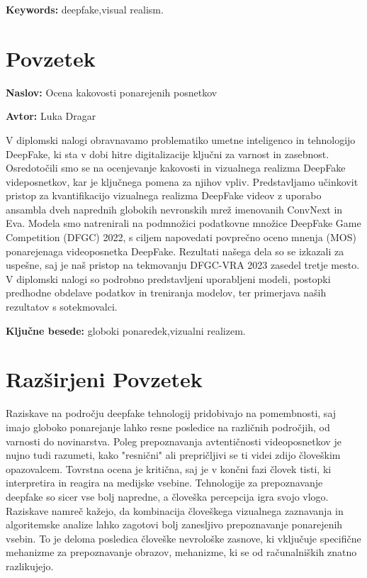 \documentclass[a4paper,12pt,openright]{book}
\newcommand{\ttitle}{Ocena kakovosti ponarejenih posnetkov}
\newcommand{\tauthor}{Luka Dragar}
\newcommand{\tkeywords}{globoki ponaredek,vizualni realizem}
\newcommand{\tkeywordsEn}{deepfake,visual realism}
\newcommand{\clearemptydoublepage}{\newpage{\pagestyle{empty}\cleardoublepage}}
\begin{document}
\bigskip

\noindent\textbf{Keywords:} \tkeywordsEn.
\clearemptydoublepage

{}
\chapter*{Povzetek}

\noindent\textbf{Naslov:} \ttitle
\bigskip

\noindent\textbf{Avtor:} \tauthor
\bigskip

\noindent V diplomski nalogi obravnavamo problematiko umetne inteligenco in tehnologijo DeepFake, ki sta v dobi hitre digitalizacije ključni za varnost in zasebnost. Osredotočili smo se na ocenjevanje kakovosti in vizualnega realizma DeepFake videposnetkov, kar je ključnega pomena za njihov vpliv. Predstavljamo učinkovit pristop za kvantifikacijo vizualnega realizma DeepFake videov z uporabo ansambla dveh naprednih globokih nevronskih mrež imenovanih ConvNext in Eva. Modela smo natrenirali na podmnožici podatkovne množice DeepFake Game Competition (DFGC) 2022, s ciljem napovedati povprečno oceno mnenja (MOS) ponarejenaga videoposnetka DeepFake. Rezultati našega dela so se izkazali za uspešne, saj je naš pristop na tekmovanju DFGC-VRA 2023 zasedel tretje mesto. V diplomski nalogi so podrobno predstavljeni uporabljeni modeli, postopki predhodne obdelave podatkov in treniranja modelov, ter primerjava naših rezultatov s sotekmovalci.

\bigskip

\noindent\textbf{Ključne besede:} \tkeywords.
\clearemptydoublepage


{}
\chapter*{Razširjeni Povzetek}
Raziskave na področju deepfake tehnologij pridobivajo na pomembnosti, saj imajo globoko ponarejanje lahko resne posledice na različnih področjih, od varnosti do novinarstva. Poleg prepoznavanja avtentičnosti videoposnetkov je nujno tudi razumeti, kako "resnični" ali prepričljivi se ti videi zdijo človeškim opazovalcem. Tovrstna ocena je kritična, saj je v končni fazi človek tisti, ki interpretira in reagira na medijske vsebine. Tehnologije za prepoznavanje deepfake so sicer vse bolj napredne, a človeška percepcija igra svojo vlogo. Raziskave namreč kažejo, da kombinacija človeškega vizualnega zaznavanja in algoritemske analize lahko zagotovi bolj zanesljivo prepoznavanje ponarejenih vsebin. To je deloma posledica človeške nevrološke zasnove, ki vključuje specifične mehanizme za prepoznavanje obrazov, mehanizme, ki se od računalniških znatno razlikujejo. 
\end{document}
